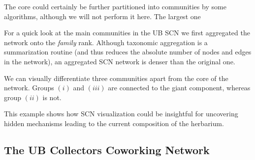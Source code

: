 The core could certainly be further partitioned into communities by some algorithms, although we will not perform it here.
The largest one




For a quick look at the main communities in the UB SCN we first aggregated the network onto the \textit{family} rank.
Although taxonomic aggregation is a summarization routine (and thus reduces the absolute number of nodes and edges in the network),  an aggregated SCN network is denser than the original one.


We can visually differentiate three communities apart from the core of the network.
Groups $(i)$ and $(iii)$ are connected to the giant component, whereas group $(ii)$ is not.


This example shows how SCN visualization could be insightful for uncovering hidden mechanisms leading to the current composition of the herbarium. 





\subsection{The UB Collectors Coworking Network}

